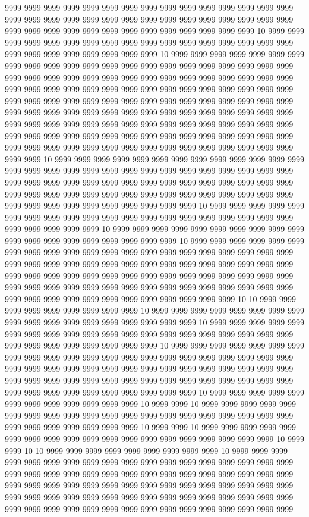 9999 9999 9999 9999 9999 9999 9999 9999 9999 9999 9999 9999 9999 9999 9999 9999 9999 9999 9999 9999 9999 9999 9999 9999 9999 9999 9999 9999 9999 9999 9999 9999 9999 9999 9999 9999 9999 9999 9999 9999 9999 9999 9999 10 9999 9999 9999 9999 9999 9999 9999 9999 9999 9999 9999 9999 9999 9999 9999 9999 9999 9999 9999 9999 9999 9999 9999 9999 9999 10 9999 9999 9999 9999 9999 9999 9999 9999 9999 9999 9999 9999 9999 9999 9999 9999 9999 9999 9999 9999 9999 9999 9999 9999 9999 9999 9999 9999 9999 9999 9999 9999 9999 9999 9999 9999 9999 9999 9999 9999 9999 9999 9999 9999 9999 9999 9999 9999 9999 9999 9999 9999 9999 9999 9999 9999 9999 9999 9999 9999 9999 9999 9999 9999 9999 9999 9999 9999 9999 9999 9999 9999 9999 9999 9999 9999 9999 9999 9999 9999 9999 9999 9999 9999 9999 9999 9999 9999 9999 9999 9999 9999 9999 9999 9999 9999 9999 9999 9999 9999 9999 9999 9999 9999 9999 9999 9999 9999 9999 9999 9999 9999 9999 9999 9999 9999 9999 9999 9999 9999 9999 9999 9999 9999 9999 9999 9999 9999 9999 10 9999 9999 9999 9999 9999 9999 9999 9999 9999 9999 9999 9999 9999 9999 9999 9999 9999 9999 9999 9999 9999 9999 9999 9999 9999 9999 9999 9999 9999 9999 9999 9999 9999 9999 9999 9999 9999 9999 9999 9999 9999 9999 9999 9999 9999 9999 9999 9999 9999 9999 9999 9999 9999 9999 9999 9999 9999 9999 9999 9999 9999 9999 9999 9999 9999 9999 9999 9999 10 9999 9999 9999 9999 9999 9999 9999 9999 9999 9999 9999 9999 9999 9999 9999 9999 9999 9999 9999 9999 9999 9999 9999 9999 9999 10 9999 9999 9999 9999 9999 9999 9999 9999 9999 9999 9999 9999 9999 9999 9999 9999 9999 9999 9999 10 9999 9999 9999 9999 9999 9999 9999 9999 9999 9999 9999 9999 9999 9999 9999 9999 9999 9999 9999 9999 9999 9999 9999 9999 9999 9999 9999 9999 9999 9999 9999 9999 9999 9999 9999 9999 9999 9999 9999 9999 9999 9999 9999 9999 9999 9999 9999 9999 9999 9999 9999 9999 9999 9999 9999 9999 9999 9999 9999 9999 9999 9999 9999 9999 9999 9999 9999 9999 9999 9999 9999 9999 9999 9999 9999 9999 9999 9999 10 10 9999 9999 9999 9999 9999 9999 9999 9999 9999 10 9999 9999 9999 9999 9999 9999 9999 9999 9999 9999 9999 9999 9999 9999 9999 9999 9999 9999 10 9999 9999 9999 9999 9999 9999 9999 9999 9999 9999 9999 9999 9999 9999 9999 9999 9999 9999 9999 9999 9999 9999 9999 9999 9999 9999 9999 9999 10 9999 9999 9999 9999 9999 9999 9999 9999 9999 9999 9999 9999 9999 9999 9999 9999 9999 9999 9999 9999 9999 9999 9999 9999 9999 9999 9999 9999 9999 9999 9999 9999 9999 9999 9999 9999 9999 9999 9999 9999 9999 9999 9999 9999 9999 9999 9999 9999 9999 9999 9999 9999 9999 9999 9999 9999 9999 9999 9999 9999 9999 9999 10 9999 9999 9999 9999 9999 9999 9999 9999 9999 9999 9999 9999 10 9999 9999 10 9999 9999 9999 9999 9999 9999 9999 9999 9999 9999 9999 9999 9999 9999 9999 9999 9999 9999 9999 9999 9999 9999 9999 9999 9999 9999 9999 10 9999 9999 10 9999 9999 9999 9999 9999 9999 9999 9999 9999 9999 9999 9999 9999 9999 9999 9999 9999 9999 9999 10 9999 9999 10 10 9999 9999 9999 9999 9999 9999 9999 9999 9999 10 9999 9999 9999 9999 9999 9999 9999 9999 9999 9999 9999 9999 9999 9999 9999 9999 9999 9999 9999 9999 9999 9999 9999 9999 9999 9999 9999 9999 9999 9999 9999 9999 9999 9999 9999 9999 9999 9999 9999 9999 9999 9999 9999 9999 9999 9999 9999 9999 9999 9999 9999 9999 9999 9999 9999 9999 9999 9999 9999 9999 9999 9999 9999 9999 9999 9999 9999 9999 9999 9999 9999 9999 9999 9999 9999 9999 9999 9999 
